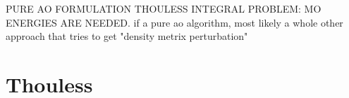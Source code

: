 






PURE AO FORMULATION THOULESS INTEGRAL
PROBLEM: MO ENERGIES ARE NEEDED. if a pure ao algorithm, most likely a whole other approach that tries to get "density metrix perturbation"

\section{Thouless}